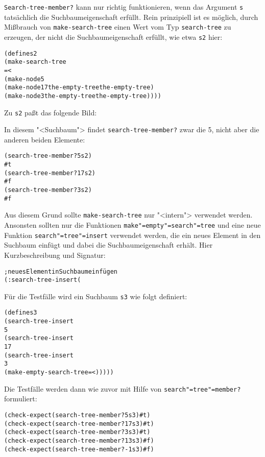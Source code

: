 \texttt{Search-tree-member?} kann nur richtig funktionieren, wenn das
Argument \texttt{s} tatsächlich die Suchbaumeigenschaft
erfüllt.  Rein prinzipiell ist es möglich, durch Mißbrauch von
\texttt{make-search-tree} einen Wert vom Typ \texttt{search-tree} zu
erzeugen, der nicht die Suchbaumeigenschaft erfüllt, wie etwa
\texttt{s2} hier:
%
\begin{alltt}
(define s2
  (make-search-tree
   = <
   (make-node 5
              (make-node 17 the-empty-tree the-empty-tree)
              (make-node 3 the-empty-tree the-empty-tree))))
\end{alltt}
%
Zu \texttt{s2} paßt das folgende Bild:
%
\begin{pspdf}
\begin{center}
  {
    }
\end{center}
\end{pspdf}
%
In diesem "<Suchbaum"> findet \texttt{search-tree-member?} zwar
die 5, nicht aber die anderen beiden Elemente:\label{label:non-search-tree}
%
\begin{alltt}
(search-tree-member? 5 s2)
\evalsto{} #t
(search-tree-member? 17 s2)
\evalsto{} #f
(search-tree-member? 3 s2)
\evalsto{} #f
\end{alltt}
%
Aus diesem Grund sollte \texttt{make-search-tree} nur "<intern">
verwendet werden.   Ansonsten sollten nur die Funktionen \texttt{make"=empty"=search"=tree} und eine
neue Funktion \texttt{search"=tree"=insert} verwendet werden, die
ein neues Element in den
Suchbaum einfügt und dabei die Suchbaumeigenschaft
erhält.
Hier Kurzbeschreibung und Signatur:
%
\begin{alltt}
; neues Element in Suchbaum einfügen
(: search-tree-insert (%a (search-tree-of %a) -> (search-tree-of %a)))
\end{alltt}
%
Für die Testfälle wird ein Suchbaum \texttt{s3} wie folgt definiert:
%
\begin{alltt}
(define s3
  (search-tree-insert
   5
   (search-tree-insert
    17
    (search-tree-insert
     3
     (make-empty-search-tree = <)))))
\end{alltt}
%
Die Testfälle werden dann wie zuvor mit Hilfe von
\texttt{search"=tree"=member?} formuliert:
%
\begin{alltt}
(check-expect (search-tree-member? 5 s3) #t)
(check-expect (search-tree-member? 17 s3) #t)
(check-expect (search-tree-member? 3 s3) #t)
(check-expect (search-tree-member? 13 s3) #f)
(check-expect (search-tree-member? -1 s3) #f)
\end{alltt}
